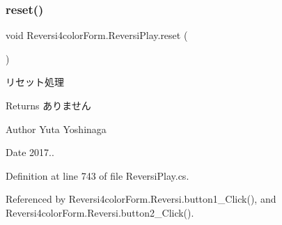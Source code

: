 \subsubsection{\texorpdfstring{reset()}{reset()}}
{\footnotesize\ttfamily void Reversi4color\+Form.\+Reversi\+Play.\+reset (\begin{DoxyParamCaption}{ }\end{DoxyParamCaption})}



リセット処理 

\begin{DoxyReturn}{Returns}
ありません 
\end{DoxyReturn}
\begin{DoxyAuthor}{Author}
Yuta Yoshinaga 
\end{DoxyAuthor}
\begin{DoxyDate}{Date}
2017.. 
\end{DoxyDate}


Definition at line 743 of file Reversi\+Play.\+cs.



Referenced by Reversi4color\+Form.\+Reversi.\+button1\+\_\+\+Click(), and Reversi4color\+Form.\+Reversi.\+button2\+\_\+\+Click().

